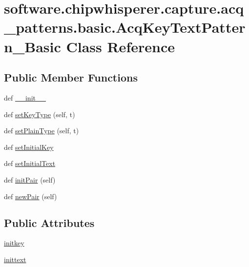\hypertarget{classsoftware_1_1chipwhisperer_1_1capture_1_1acq__patterns_1_1basic_1_1AcqKeyTextPattern__Basic}{}\section{software.\+chipwhisperer.\+capture.\+acq\+\_\+patterns.\+basic.\+Acq\+Key\+Text\+Pattern\+\_\+\+Basic Class Reference}
\label{classsoftware_1_1chipwhisperer_1_1capture_1_1acq__patterns_1_1basic_1_1AcqKeyTextPattern__Basic}
\subsection*{Public Member Functions}
\begin{DoxyCompactItemize}
\item 
def \hyperlink{classsoftware_1_1chipwhisperer_1_1capture_1_1acq__patterns_1_1basic_1_1AcqKeyTextPattern__Basic_aad8f7c1cb9a8af0c344926e63ea3d5ff}{\+\_\+\+\_\+init\+\_\+\+\_\+}
\item 
def \hyperlink{classsoftware_1_1chipwhisperer_1_1capture_1_1acq__patterns_1_1basic_1_1AcqKeyTextPattern__Basic_a2aa054ea0ee898c98c808167ffc91f32}{set\+Key\+Type} (self, t)
\item 
def \hyperlink{classsoftware_1_1chipwhisperer_1_1capture_1_1acq__patterns_1_1basic_1_1AcqKeyTextPattern__Basic_a1d062d7b805afb9a4d1bfe18195fb609}{set\+Plain\+Type} (self, t)
\item 
def \hyperlink{classsoftware_1_1chipwhisperer_1_1capture_1_1acq__patterns_1_1basic_1_1AcqKeyTextPattern__Basic_a2240fbe06c87c9af0f8585e22e44a40d}{set\+Initial\+Key}
\item 
def \hyperlink{classsoftware_1_1chipwhisperer_1_1capture_1_1acq__patterns_1_1basic_1_1AcqKeyTextPattern__Basic_a85474ba4ecad24799e26bce096aa5c21}{set\+Initial\+Text}
\item 
def \hyperlink{classsoftware_1_1chipwhisperer_1_1capture_1_1acq__patterns_1_1basic_1_1AcqKeyTextPattern__Basic_a1cc15b81e180e7dab6cde6046dddba2c}{init\+Pair} (self)
\item 
def \hyperlink{classsoftware_1_1chipwhisperer_1_1capture_1_1acq__patterns_1_1basic_1_1AcqKeyTextPattern__Basic_a790d519c9ce350a536817fc35a38ed51}{new\+Pair} (self)
\end{DoxyCompactItemize}
\subsection*{Public Attributes}
\begin{DoxyCompactItemize}
\item 
\hyperlink{classsoftware_1_1chipwhisperer_1_1capture_1_1acq__patterns_1_1basic_1_1AcqKeyTextPattern__Basic_a1f07994b453305f8d7c993c874d00897}{initkey}
\item 
\hyperlink{classsoftware_1_1chipwhisperer_1_1capture_1_1acq__patterns_1_1basic_1_1AcqKeyTextPattern__Basic_ac021927c14f87274de7dd91f4f4b1adc}{inittext}
\end{DoxyCompactItemize}


